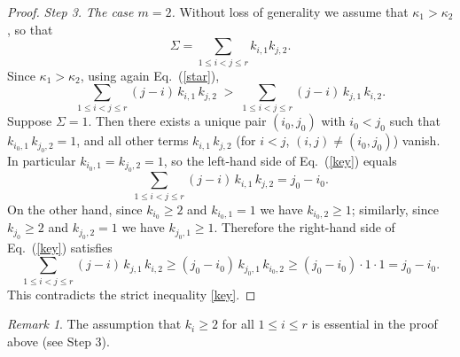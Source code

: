 \documentclass[12pt]{amsart}
\theoremstyle{definition}
\theoremstyle{remark}
\newtheorem{rem}[thm]{Remark}
\begin{document}
\begin{proof}
{\it Step 3.} {\it The case $m=2$.} 
Without loss of generality we assume that $\kappa_1>\kappa_2$, so that
$$\Sigma=\sum_{1\le i<j\le r} k_{i,1}k_{j,2}.$$
Since $\kappa_1>\kappa_2$, using again Eq.~(\ref{star}),
\begin{equation}\label{key}
  \sum_{1 \le i < j \le r} (j - i)\,k_{i,1}\,k_{j,2}
  \;>\;
  \sum_{1 \le i < j \le r} (j - i)\,k_{j,1}\,k_{i,2}. 
  \end{equation}
Suppose $\Sigma = 1$. Then there exists a unique pair $(i_0, j_0)$ with $i_0 < j_0$ such that
$k_{i_0,1}\,k_{j_0,2} = 1$, and all other terms $k_{i,1}\,k_{j,2}$ (for $i < j$,
$(i,j)\ne(i_0,j_0)$) vanish. In particular $k_{i_0,1} = k_{j_0,2} = 1$, so the
left-hand side of Eq.~(\ref{key}) equals 
\[
  \sum_{1 \le i < j \le r} (j - i)\,k_{i,1}\,k_{j,2} = j_0 - i_0.
\]
On the other hand, since $k_{i_0} \ge 2$ and $k_{i_0,1} = 1$ we have $k_{i_0,2} \ge 1$;
similarly, since $k_{j_0} \ge 2$ and $k_{j_0,2} = 1$ we have $k_{j_0,1} \ge 1$.
Therefore the right-hand side of Eq.~(\ref{key}) satisfies
\[
  \sum_{1 \le i < j \le r} (j-i)\,k_{j,1}\,k_{i,2}
  \ge (j_0 - i_0)\,k_{j_0,1}\,k_{i_0,2}
  \ge (j_0 - i_0) \cdot 1 \cdot 1
  =j_0 - i_0.
\]
This contradicts the strict inequality \eqref{key}. 
\end{proof}
 
 \begin{rem}
 The assumption that $k_i\ge 2$ for all $1\le i \le r$ is essential in the proof above (see Step 3). \end{rem}
 
\end{document}

